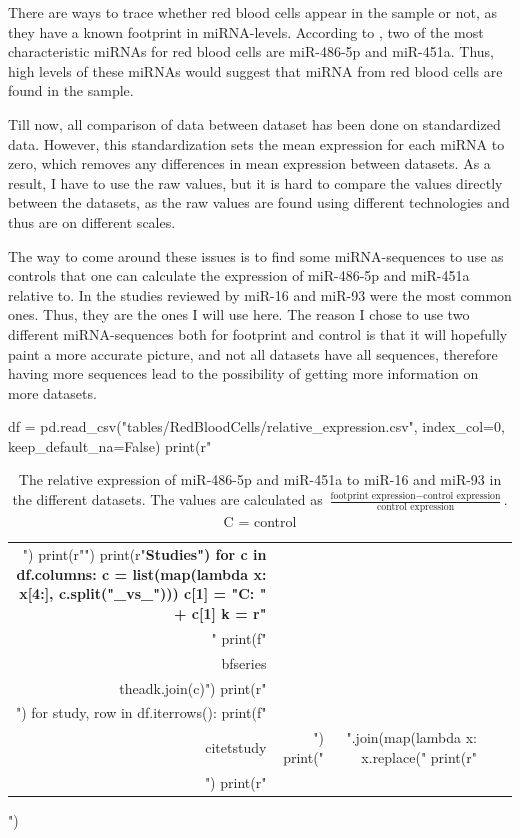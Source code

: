 {{{{{{{{{{{{{{There are ways to trace whether red blood cells appear in the sample or not, as they have a known footprint in miRNA-levels. According to \citet{rbc_mirnas}, two of the most characteristic miRNAs for red blood cells are miR-486-5p and miR-451a. Thus, high levels of these miRNAs would suggest that miRNA from red blood cells are found in the sample. 

Till now, all comparison of data between dataset has been done on standardized data. However, this standardization sets the mean expression for each miRNA to zero, which removes any differences in mean expression between datasets. As a result, I have to use the raw values, but it is hard to compare the values directly between the datasets, as the raw values are found using different technologies and thus are on different scales. 

The way to come around these issues is to find some miRNA-sequences to use as controls that one can calculate the expression of miR-486-5p and miR-451a relative to. In the studies reviewed by \citet{mrna_baseline} miR-16 and miR-93 were the most common ones. Thus, they are the ones I will use here. The reason I chose to use two different miRNA-sequences both for footprint and control is that it will hopefully paint a more accurate picture, and not all datasets have all sequences, therefore having more sequences lead to the possibility of getting more information on more datasets.

\begin{table}
    \caption{The relative expression of miR-486-5p and miR-451a to miR-16 and miR-93 in the different datasets. The values are calculated as $\frac{\text{footprint expression} - \text{control expression}}{\text{control expression}}$. C = control}
    \label{tab:relative_expression}
\begin{pycode}
df = pd.read_csv("tables/RedBloodCells/relative_expression.csv", index_col=0, keep_default_na=False)
print(r"\begin{tabular}{|r|r|r|r|r|}")
print(r"\hline")
print(r"\bfseries Studies")
for c in df.columns:
    c = list(map(lambda x: x[4:], c.split("_vs_")))
    c[1] = "C: " + c[1]
    k = r" \\ "
    print(f" & \\bfseries \\thead{{{k.join(c)}}}")
print(r"\\ \hline")
for study, row in df.iterrows():
    print(f"\\citet{{{study}}} & ") 
    print(" & ".join(map(lambda x: x.replace("%
    print(r"\\ ")
print(r"\hline \end{tabular}")
\end{pycode}
\end{table}

}}}}}}}}}}}}}}

